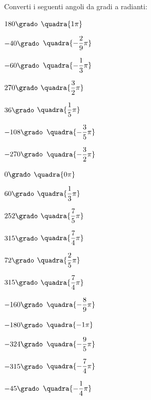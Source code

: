 \begin{esercizio}\label{ese:gonio.1}
 Converti i seguenti angoli da gradi a radianti:
\begin{multicols}{3}
 \begin{enumeratea}
  \item  \(180\grado\)
   \hfill \(\quadra{1\pi}\)
  \item  \(-40\grado\)
   \hfill \(\quadra{-\dfrac{2}{9}\pi}\)
  \item  \(-60\grado\)
   \hfill \(\quadra{-\dfrac{1}{3}\pi}\)
  \item  \(270\grado\)
   \hfill \(\quadra{\dfrac{3}{2}\pi}\)
  \item  \(36\grado\)
   \hfill \(\quadra{\dfrac{1}{5}\pi}\)
  \item  \(-108\grado\)
   \hfill \(\quadra{-\dfrac{3}{5}\pi}\)
  \item  \(-270\grado\)
   \hfill \(\quadra{-\dfrac{3}{2}\pi}\)
  \item  \(0\grado\)
   \hfill \(\quadra{0\pi}\)
  \item  \(60\grado\)
   \hfill \(\quadra{\dfrac{1}{3}\pi}\)
  \item  \(252\grado\)
   \hfill \(\quadra{\dfrac{7}{5}\pi}\)
  \item  \(315\grado\)
   \hfill \(\quadra{\dfrac{7}{4}\pi}\)
  \item  \(72\grado\)
   \hfill \(\quadra{\dfrac{2}{5}\pi}\)
  \item  \(315\grado\)
   \hfill \(\quadra{\dfrac{7}{4}\pi}\)
  \item  \(-160\grado\)
   \hfill \(\quadra{-\dfrac{8}{9}\pi}\)
  \item  \(-180\grado\)
   \hfill \(\quadra{-1\pi}\)
  \item  \(-324\grado\)
   \hfill \(\quadra{-\dfrac{9}{5}\pi}\)
  \item  \(-315\grado\)
   \hfill \(\quadra{-\dfrac{7}{4}\pi}\)
  \item  \(-45\grado\)
   \hfill \(\quadra{-\dfrac{1}{4}\pi}\)
 \end{enumeratea}
\end{multicols}
\end{esercizio}

